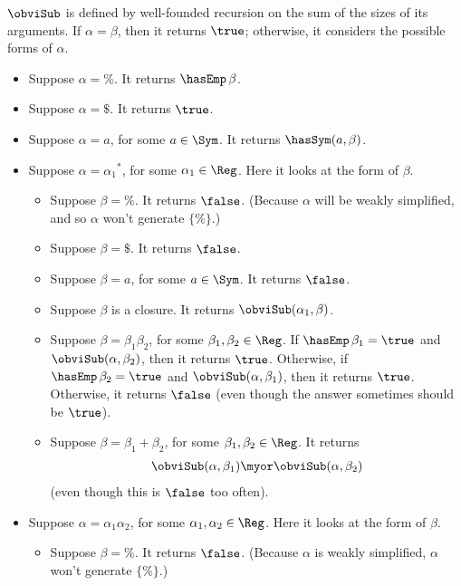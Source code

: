 $\obviSub$ is defined by well-founded recursion on the sum of the
sizes of its arguments.  If $\alpha=\beta$, then it returns $\true$;
otherwise, it considers the possible forms of $\alpha$.
\begin{itemize}
\item Suppose $\alpha = \%$. It returns $\hasEmp\,\beta$.

\item Suppose $\alpha = \$$. It returns $\true$.

\item Suppose $\alpha = a$, for some $a\in\Sym$. It returns $\hasSym(a,
  \beta)$.

\item Suppose $\alpha = {\alpha_1}^*$, for some $\alpha_1\in\Reg$.
Here it looks at the form of $\beta$.
\begin{itemize}
\item Suppose $\beta = \%$. It returns $\false$.  (Because
$\alpha$ will be weakly simplified, and so $\alpha$ won't generate
$\{\%\}$.)

\item Suppose $\beta = \$$. It returns $\false$.

\item Suppose $\beta = a$, for some $a\in\Sym$. It returns $\false$.

\item Suppose $\beta$ is a closure.  It returns $\obviSub(\alpha_1, \beta)$.

\item Suppose $\beta=\beta_1\beta_2$, for some $\beta_1,\beta_2\in\Reg$.
If $\hasEmp\,\beta_1=\true$ and $\obviSub(\alpha,\beta_2)$,
then it returns $\true$.
Otherwise, if $\hasEmp\,\beta_2=\true$ and $\obviSub(\alpha,\beta_1)$,
then it returns $\true$.
Otherwise, it returns $\false$ (even though the answer sometimes
should be $\true$).

\item Suppose $\beta = \beta_1 + \beta_2$, for some $\beta_1,\beta_2\in\Reg$.
It returns
\begin{gather*}
\obviSub(\alpha, \beta_1) \myor \obviSub(\alpha, \beta_2)
\end{gather*}
(even though this is $\false$ too often).
\end{itemize}

\item Suppose $\alpha = \alpha_1\alpha_2$, for some $\alpha_1,\alpha_2\in\Reg$.
Here it looks at the form of $\beta$.
\begin{itemize}
\item Suppose $\beta = \%$.  It returns $\false$.  (Because $\alpha$
  is weakly simplified, $\alpha$ won't generate $\{\%\}$.)


\end{itemize}
\end{itemize}
